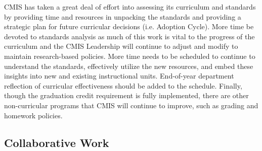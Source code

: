\begin{findings}

CMIS has taken a great deal of effort into assessing its curriculum and standards by providing time and resources in unpacking the standards and providing a strategic plan for future curricular decisions (i.e. Adoption Cycle). More time be devoted to standards analysis as much of this work is vital to the progress of the curriculum and the CMIS Leadership will continue to adjust and modify to maintain research-based policies. More time needs to be scheduled to continue to understand the standards, effectively utilize the new resources, and embed these insights into new and existing instructional units. End-of-year department reflection of curricular effectiveness should be added to the schedule. Finally, though the graduation credit requirement is fully implemented, there are other non-curricular programs that CMIS will continue to improve, such as grading and homework policies.
\end{findings}

\subsection{Collaborative Work}



